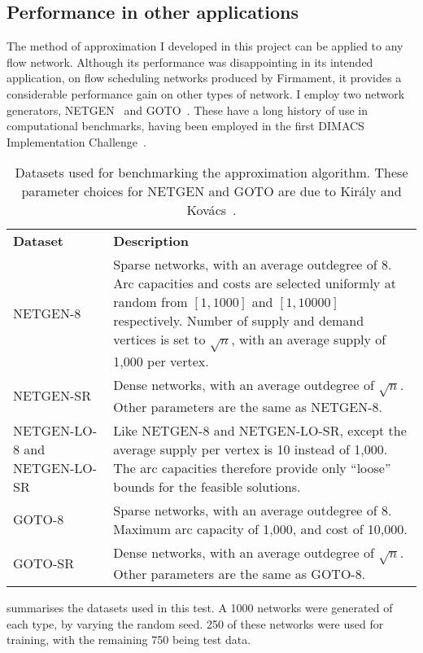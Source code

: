 \subsection{Performance in other applications}

The method of approximation I developed in this project can be applied to any flow network. Although its performance was disappointing in its intended application, on flow scheduling networks produced by Firmament, it provides a considerable performance gain on other types of network. I employ two network generators, NETGEN~\cite{Klingman:1974} and GOTO~\cite{GoldbergDIMACS:1993}. These have a long history of use in computational benchmarks, having been employed in the first DIMACS Implementation Challenge~\cite{DIMACSChallenge:Book}.

\begin{table}
    \centering
    \setlength{\tabcolsep}{1.5em}
    \begin{tabular}{p{}p{}}
        \textbf{Dataset} & \textbf{Description} \tabularnewline
        NETGEN-8 & Sparse networks, with an average outdegree of $8$. Arc capacities and costs are selected uniformly at random from $\left[1,1000\right]$ and $\left[1,10000\right]$ respectively. Number of supply and demand vertices is set to $\sqrt{n}$, with an average supply of 1,000 per vertex. \tabularnewline
        NETGEN-SR & Dense networks, with an average outdegree of $\sqrt{n}$. Other parameters are the same as NETGEN-8. \tabularnewline
        NETGEN-LO-8 and NETGEN-LO-SR & Like NETGEN-8 and NETGEN-LO-SR, except the average supply per vertex is 10 instead of 1,000. The arc capacities therefore provide only ``loose'' bounds for the feasible solutions. \tabularnewline
        GOTO-8 & Sparse networks, with an average outdegree of $8$. Maximum arc capacity of 1,000, and cost of 10,000. \tabularnewline
        GOTO-SR & Dense networks, with an average outdegree of $\sqrt{n}$. Other parameters are the same as GOTO-8. \tabularnewline
    \end{tabular}
    \caption[Datasets used for benchmarking the approximation algorithm.]{Datasets used for benchmarking the approximation algorithm. These parameter choices for NETGEN and GOTO are due to Kir{\'{a}}ly and Kov{\'{a}}cs~\cite{KiralyKovacs:2012}.}
    \label{table:general-datasets}
\end{table}

 summarises the datasets used in this test. A 1000 networks were generated of each type, by varying the random seed. 250 of these networks were used for training, with the remaining 750 being test data.

